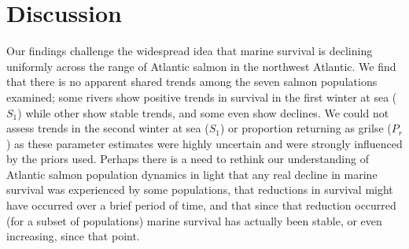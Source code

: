 \documentclass[12pt]{article}
\newcommand{\So}{$S_{1}$\xspace}
\newcommand{\Pg}{$P_r$\xspace}
\begin{document}
\section*{Discussion} 


Our findings challenge the widespread idea that marine survival is declining
uniformly across the range of Atlantic salmon in the northwest Atlantic. We
find that there is no apparent shared trends among the seven salmon
populations examined; some rivers show positive trends in survival in the
first winter at sea (\So) while other show stable trends, and some even show
declines. We could not assess trends in the second winter at sea (\So) or
proportion returning as grilse (\Pg) as these parameter estimates were highly
uncertain and were strongly influenced by the priors used.
Perhaps there is a need to rethink our understanding of Atlantic salmon
population dynamics in light that any real decline in marine survival was
experienced by some populations, that reductions in survival might
have occurred over a brief period of time, and that since that
reduction occurred (for a subset of populations) marine survival has actually
been stable, or even increasing, since that point.
\end{document}
